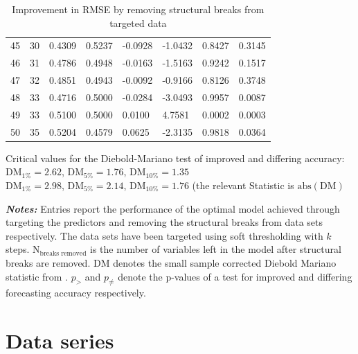 \documentclass[12pt]{article}
\begin{document}
\begin{table}[htp]
\begin{tabular}{cc|lll|lll}
			45 & 30 & 0.4309 & 0.5237 & -0.0928 & -1.0432 & 0.8427 & 0.3145 \\
			46 & 31 & 0.4786 & 0.4948 & -0.0163 & -1.5163 & 0.9242 & 0.1517 \\
			47 & 32 & 0.4851 & 0.4943 & -0.0092 & -0.9166 & 0.8126 & 0.3748 \\
			48 & 33 & 0.4716 & 0.5000 & -0.0284 & -3.0493 & 0.9957 & 0.0087 \\ 
			49 & 33 & 0.5100 & 0.5000 & 0.0100 & 4.7581 & 0.0002 & 0.0003 \\
			50 & 35 & 0.5204 & 0.4579 & 0.0625 & -2.3135 & 0.9818 & 0.0364 \\ 
		\hline
	\end{tabular}
	\begin{minipage}{14cm}
		Critical values for the Diebold-Mariano test of improved and differing accuracy: \\ DM$_{1\%} = 2.62$, DM$_{5\%} = 1.76$, DM$_{10\%} = 1.35$ \\ DM$_{1\%} = 2.98$, DM$_{5\%} = 2.14$, DM$_{10\%} = 1.76$ (the relevant Statistic is $\text{abs}(\text{DM})$
	\end{minipage}
	\begin{minipage}{16cm}
		\small{\textbf{\textit{Notes:}} Entries report the performance of the optimal model achieved through targeting the predictors and removing the structural breaks from data sets respectively. The data sets have been targeted using soft thresholding with $k$ steps. N$_{\text{breaks removed}}$ is the number of variables left in the model after structural breaks are removed. DM denotes the small sample corrected Diebold Mariano statistic from \citet{harvey1997testing}. $p_>$ and $p_{\not =}$ denote the p-values of a test for improved and differing forecasting accuracy respectively.}
	\end{minipage}
	\caption{Improvement in RMSE by removing structural breaks from targeted data}
	\label{diff rmse by removing breaks after targeting}
\end{table}





\clearpage
\newpage

\section{Data series}
\label{Data series}
\end{document}
